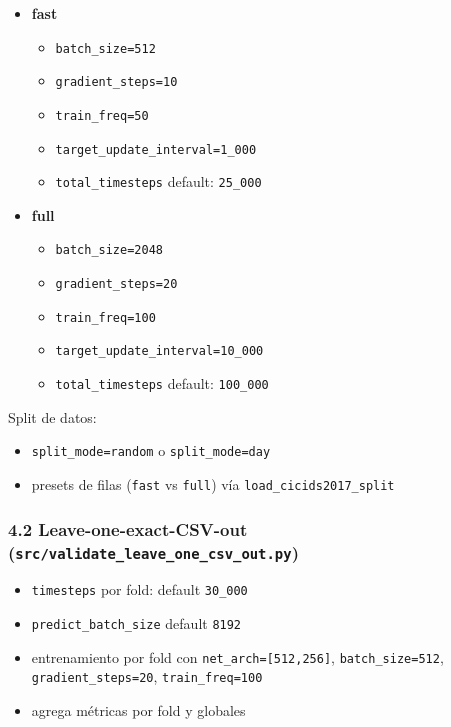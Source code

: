 ﻿\documentclass[12pt,a4paper]{article}
\begin{document}
\begin{itemize}
  \item \textbf{fast}
    \begin{itemize}
      \item \texttt{batch\_size=512}
      \item \texttt{gradient\_steps=10}
      \item \texttt{train\_freq=50}
      \item \texttt{target\_update\_interval=1\_000}
      \item \texttt{total\_timesteps} default: \texttt{25\_000}
    \end{itemize}
  \item \textbf{full}
    \begin{itemize}
      \item \texttt{batch\_size=2048}
      \item \texttt{gradient\_steps=20}
      \item \texttt{train\_freq=100}
      \item \texttt{target\_update\_interval=10\_000}
      \item \texttt{total\_timesteps} default: \texttt{100\_000}
    \end{itemize}
\end{itemize}

Split de datos:

\begin{itemize}
  \item \texttt{split\_mode=random} o \texttt{split\_mode=day}
  \item presets de filas (\texttt{fast} vs \texttt{full}) vía \verb|load_cicids2017_split|
\end{itemize}

\subsubsection{4.2 Leave-one-exact-CSV-out (\texttt{src/validate\_leave\_one\_csv\_out.py})}

\begin{itemize}
  \item \texttt{timesteps} por fold: default \texttt{30\_000}
  \item \texttt{predict\_batch\_size} default \texttt{8192}
  \item entrenamiento por fold con \texttt{net\_arch=[512,256]}, \texttt{batch\_size=512},
        \texttt{gradient\_steps=20}, \texttt{train\_freq=100}
  \item agrega métricas por fold y globales
\end{itemize}
\end{document}
